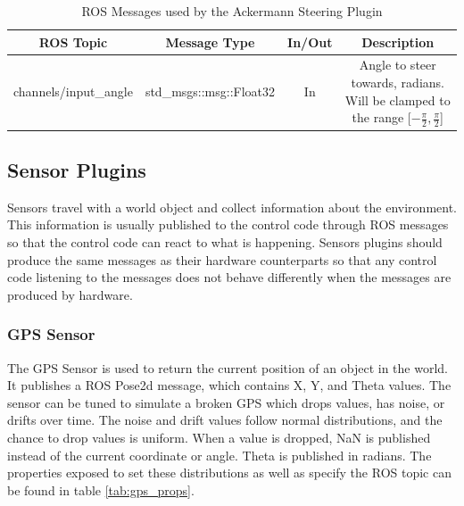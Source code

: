 \begin{itemize}
\begin{table}[h!]
	\centering
	\caption{ROS Messages used by the Ackermann Steering Plugin}
	\label{tab:ackermann_msgs}
	\begin{tabular}{c|c|c|c}
	ROS Topic & Message Type & In/Out & Description\\ \hline \hline
	channels/input\_angle & std\_msgs::msg::Float32 & In & \makecell{Angle to steer towards, radians.\\ Will be clamped to the range [$-\frac{\pi}{2},\frac{\pi}{2}$]}
	\end{tabular}
\end{table}

\subsection{Sensor Plugins}
Sensors travel with a world object and collect information about the environment. This information is usually published to the control code through ROS messages so that the control code can react to what is happening. Sensors plugins should produce the same messages as their hardware counterparts so that any control code listening to the messages does not behave differently when the messages are produced by hardware.

\subsubsection*{GPS Sensor}
The GPS Sensor is used to return the current position of an object in the world. It publishes a ROS Pose2d message, which contains
X, Y, and Theta values. The sensor can be tuned to simulate a broken GPS which drops values, has noise, or drifts over time. The noise and drift values follow normal distributions, and the chance to drop values is uniform. When a value is dropped, NaN is published instead of the current coordinate or angle. Theta is published in radians. The properties exposed to set these 
distributions as well as specify the ROS topic can be found in table \ref{tab:gps_props}.
	

\end{itemize}
